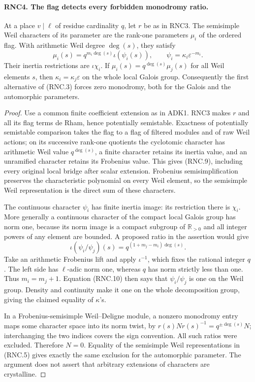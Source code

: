 \documentclass[11pt,a4paper]{article}
\numberwithin{equation}{section}
\theoremstyle{remark}\newtheorem{remark}[theorem]{Remark}
\begin{document}
\paragraph{RNC4. The flag detects every forbidden monodromy ratio.}
\label{claim:RNC4}
At a place $v\mid\ell$ of residue cardinality $q$, let $r$
be as in RNC3.  The semisimple Weil characters of its parameter
are the rank-one parameters $\mu_i$ of the ordered flag.
With arithmetic Weil degree $\deg(s)$, they satisfy
\[
 \mu_i(s)=q^{m_i\deg(s)}\iota(\psi_i(s)),\qquad
 \psi_i=\kappa_i\varepsilon^{-m_i}.                            \tag{RNC.9}
\]
Their inertia restrictions are $\iota\chi_i$.  If
$\mu_i(s)=q^{\deg(s)}\mu_j(s)$ for all Weil elements $s$,
then $\kappa_i=\kappa_j\varepsilon$ on the whole local Galois
group.  Consequently the first alternative of (RNC.3) forces
zero monodromy, both for the Galois and the automorphic
parameters.
\begin{proof}
Use a common finite coefficient extension as in ADK1.
RNC3 makes $r$ and all its flag terms de Rham, hence potentially
semistable.  Exactness of potentially semistable comparison
takes the flag to a flag of filtered modules and of raw Weil
actions; on its successive rank-one quotients the cyclotomic
character has arithmetic Weil value $q^{\deg(s)}$, a finite
character retains its inertia value, and an unramified
character retains its Frobenius value.  This gives (RNC.9),
including every original local bridge after scalar extension.
Frobenius semisimplification preserves the characteristic
polynomial on every Weil element, so the semisimple Weil
representation is the direct sum of these characters.

The continuous character $\psi_i$ has finite inertia image:
its restriction there is $\chi_i$.  More generally a continuous
character of the compact local Galois group has norm one,
because its norm image is a compact subgroup of
$\mathbb R_{>0}$ and all integer powers of any element are
bounded.  A proposed ratio in the assertion would give
\[
 \iota(\psi_i/\psi_j)(s)
                    =q^{(1+m_j-m_i)\deg(s)}.
                                                               \tag{RNC.10}
\]
Take an arithmetic Frobenius lift and apply $\iota^{-1}$,
which fixes the rational integer $q$.  The left side has
$\ell$-adic norm one, whereas $q$ has norm strictly less than
one.  Thus $m_i=m_j+1$.  Equation (RNC.10) then says that
$\psi_i/\psi_j$ is one on the Weil group.  Density and
continuity make it one on the whole decomposition group,
giving the claimed equality of $\kappa$'s.

In a Frobenius-semisimple Weil--Deligne module, a nonzero
monodromy entry maps some character space into its norm twist,
by $r(s)Nr(s)^{-1}=q^{\pm\deg(s)}N$; interchanging the two
indices covers the sign convention.  All such ratios were
excluded.  Therefore $N=0$.  Equality of the semisimple Weil
representations in (RNC.5) gives exactly the same exclusion
for the automorphic parameter.  The argument does not assert
that arbitrary extensions of characters are crystalline.
\end{proof}
\end{document}
